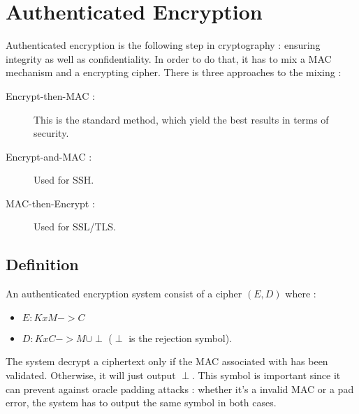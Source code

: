 \section{Authenticated Encryption}	
\label{sec:AuthenticatedEncryption}

Authenticated encryption is the following step in cryptography : ensuring integrity as well as confidentiality. In order to do that, it has to mix a MAC mechanism and a encrypting cipher. There is three approaches to the mixing :

\begin{description}
	\item[Encrypt-then-MAC :] This is the standard method, which yield the best results in terms of security.
	\item[Encrypt-and-MAC :]  Used for SSH.
	\item[MAC-then-Encrypt :] Used for SSL/TLS.
\end{description}


\subsection{Definition}

An authenticated encryption system consist of a cipher $(E,D)$ where : 
\begin{itemize}
	\item $E: KxM -> C$
	\item $D: KxC -> M\cup{\perp}$  ($\perp$ is the rejection symbol).
\end{itemize}

The system decrypt a ciphertext only if the MAC associated with has been validated. Otherwise, it will just output $\perp$. This symbol is important since it can prevent against oracle padding attacks : whether it's a invalid MAC or a pad error, the system has to output the same symbol in both cases.